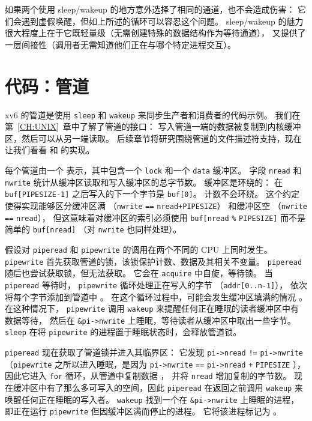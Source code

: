 如果两个使用 sleep/wakeup 的地方意外选择了相同的通道，也不会造成伤害：
它们会遇到虚假唤醒，但如上所述的循环可以容忍这个问题。
sleep/wakeup 的魅力很大程度上在于它既轻量级（无需创建特殊的数据结构作为等待通道），
又提供了一层间接性（调用者无需知道他们正在与哪个特定进程交互）。

\section{代码：管道}
xv6 的管道是使用 \lstinline{sleep} 和 \lstinline{wakeup} 来同步生产者和消费者的代码示例。
我们在第~\ref{CH:UNIX}~章中了解了管道的接口：
写入管道一端的数据被复制到内核缓冲区，然后可以从另一端读取。
后续章节将研究围绕管道的文件描述符支持，现在让我们看看
和
的实现。

每个管道由一个
表示，其中包含一个
\lstinline{lock}
和一个
\lstinline{data}
缓冲区。
字段
\lstinline{nread}
和
\lstinline{nwrite}
统计从缓冲区读取和写入缓冲区的总字节数。
缓冲区是环绕的：
在
\lstinline{buf[PIPESIZE-1]}
之后写入的下一个字节是
\lstinline{buf[0]}。
计数不会环绕。
这个约定使得实现能够区分缓冲区满
（\lstinline{nwrite}
\lstinline{==}
\lstinline{nread+PIPESIZE}）
和缓冲区空
（\lstinline{nwrite}
\lstinline{==}
\lstinline{nread}），
但这意味着对缓冲区的索引必须使用
\lstinline{buf[nread}
\lstinline{%}
\lstinline{PIPESIZE]}
而不是简单的
\lstinline{buf[nread]} 
（对 \lstinline{nwrite} 也同样处理）。

假设对
\lstinline{piperead}
和
\lstinline{pipewrite}
的调用在两个不同的 CPU 上同时发生。
\lstinline{pipewrite}
首先获取管道的锁，该锁保护计数、数据及其相关不变量。
\lstinline{piperead}
随后也尝试获取锁，但无法获取。
它会在
\lstinline{acquire}
中自旋，等待锁。
当
\lstinline{piperead}
等待时，
\lstinline{pipewrite}
循环处理正在写入的字节
（\lstinline{addr[0..n-1]}），
依次将每个字节添加到管道中
。
在这个循环过程中，可能会发生缓冲区填满的情况
。
在这种情况下，
\lstinline{pipewrite}
调用
\lstinline{wakeup}
来提醒任何正在睡眠的读者缓冲区中有数据等待，
然后在
\lstinline{&pi->nwrite}
上睡眠，等待读者从缓冲区中取出一些字节。
\lstinline{sleep}
在将
\lstinline{pipewrite}
的进程置于睡眠状态时，会释放管道锁。

\lstinline{piperead}
现在获取了管道锁并进入其临界区：
它发现
\lstinline{pi->nread}
\lstinline{!=}
\lstinline{pi->nwrite}
（\lstinline{pipewrite}
之所以进入睡眠，是因为
\lstinline{pi->nwrite}
\lstinline{==}
\lstinline{pi->nread}
\lstinline{+}
\lstinline{PIPESIZE}
），
因此它进入
\lstinline{for}
循环，从管道中复制数据
，
并将
\lstinline{nread}
增加复制的字节数。
现在缓冲区中有了那么多可写入的空间，因此
\lstinline{piperead}
在返回之前调用
\lstinline{wakeup}
来唤醒任何正在睡眠的写入者。
\lstinline{wakeup}
找到一个在
\lstinline{&pi->nwrite}
上睡眠的进程，即正在运行
\lstinline{pipewrite}
但因缓冲区满而停止的进程。
它将该进程标记为
。

